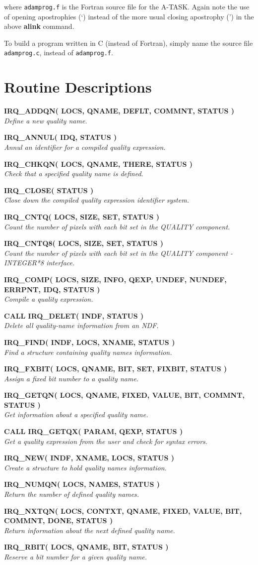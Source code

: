 \documentclass[twoside,11pt,nolof]{starlink}
\providecommand{\noteroutine}[2]{\textbf{#1}\hspace*{\fill}\nopagebreak \\
                             \hspace*{3em}\emph{#2}\hspace*{\fill}\par}
\begin{document}
where \texttt{adamprog.f} is the Fortran source file for the A-TASK. Again
note the use of opening apostrophies (`) instead of the more usual
closing apostrophy (') in the above \textbf{alink} command.

To build a program written in C (instead of Fortran), simply name the
source file \texttt{adamprog.c}, instead of \texttt{adamprog.f}.

\newpage
\appendix
\section {Routine Descriptions}

\noteroutine{IRQ\_ADDQN( LOCS, QNAME, DEFLT, COMMNT, STATUS )}
   {Define a new quality name.}
\noteroutine{IRQ\_ANNUL( IDQ, STATUS )}
   {Annul an identifier for a compiled quality expression.}
\noteroutine{IRQ\_CHKQN( LOCS, QNAME, THERE, STATUS )}
   {Check that a specified quality name is defined.}
\noteroutine{IRQ\_CLOSE( STATUS )}
   {Close down the compiled quality expression identifier system.}
\noteroutine{IRQ\_CNTQ( LOCS, SIZE, SET, STATUS )}
   {Count the number of pixels with each bit set in the QUALITY component.}
\noteroutine{IRQ\_CNTQ8( LOCS, SIZE, SET, STATUS )}
   {Count the number of pixels with each bit set in the QUALITY component - INTEGER*8 interface.}
\noteroutine{IRQ\_COMP( LOCS, SIZE, INFO, QEXP, UNDEF, NUNDEF, ERRPNT, IDQ, STATUS )}
   {Compile a quality expression.}
\noteroutine{CALL IRQ\_DELET( INDF, STATUS )}
   {Delete all quality-name information from an NDF.}
\noteroutine{IRQ\_FIND( INDF, LOCS, XNAME, STATUS )}
   {Find a structure containing quality names information.}
\noteroutine{IRQ\_FXBIT( LOCS, QNAME, BIT, SET, FIXBIT, STATUS )}
   {Assign a fixed bit number to a quality name.}
\noteroutine{IRQ\_GETQN( LOCS, QNAME, FIXED, VALUE, BIT, COMMNT, STATUS )}
   {Get information about a specified quality name.}
\noteroutine{CALL IRQ\_GETQX( PARAM, QEXP, STATUS )}
   {Get a quality expression from the user and check for syntax errors.}
\noteroutine{IRQ\_NEW( INDF, XNAME, LOCS, STATUS )}
   {Create a structure to hold quality names information.}
\noteroutine{IRQ\_NUMQN( LOCS, NAMES, STATUS )}
   {Return the number of defined quality names.}
\noteroutine{IRQ\_NXTQN( LOCS, CONTXT, QNAME, FIXED, VALUE, BIT, COMMNT, DONE, STATUS )}
   {Return information about the next defined quality name.}
\noteroutine{IRQ\_RBIT( LOCS, QNAME, BIT, STATUS )}
   {Reserve a bit number for a given quality name.}
\end{document}
